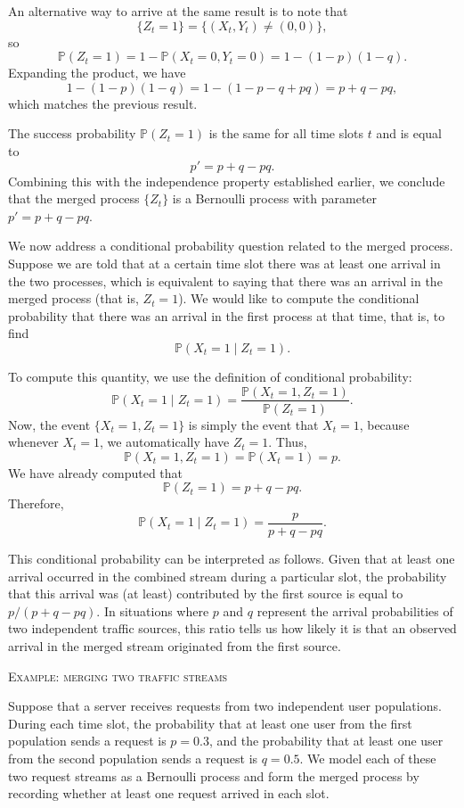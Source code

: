 An alternative way to arrive at the same result is to note that
\[
\{Z_t = 1\}
=
\{(X_t, Y_t) \neq (0,0)\},
\]
so
\[
\mathbb{P}(Z_t = 1)
=
1 - \mathbb{P}(X_t = 0, Y_t = 0)
=
1 - (1-p)(1-q).
\]
Expanding the product, we have
\[
1 - (1-p)(1-q)
=
1 - (1 - p - q + pq)
=
p + q - pq,
\]
which matches the previous result.  

The success probability \(\mathbb{P}(Z_t = 1)\) is the same for all time slots \(t\) and is equal to
\[
p' = p + q - pq.
\]
Combining this with the independence property established earlier, we conclude that the merged process \(\{Z_t\}\) is a Bernoulli process with parameter \(p' = p + q - pq\).  

We now address a conditional probability question related to the merged process.  
Suppose we are told that at a certain time slot there was at least one arrival in the two processes, which is equivalent to saying that there was an arrival in the merged process (that is, \(Z_t = 1\)).  
We would like to compute the conditional probability that there was an arrival in the first process at that time, that is, to find
\[
\mathbb{P}(X_t = 1 \mid Z_t = 1).
\]

To compute this quantity, we use the definition of conditional probability:
\[
\mathbb{P}(X_t = 1 \mid Z_t = 1)
=
\frac{\mathbb{P}(X_t = 1, Z_t = 1)}{\mathbb{P}(Z_t = 1)}.
\]
Now, the event \(\{X_t = 1, Z_t = 1\}\) is simply the event that \(X_t = 1\), because whenever \(X_t = 1\), we automatically have \(Z_t = 1\).  
Thus,
\[
\mathbb{P}(X_t = 1, Z_t = 1) = \mathbb{P}(X_t = 1) = p.
\]
We have already computed that
\[
\mathbb{P}(Z_t = 1) = p + q - pq.
\]
Therefore,
\[
\mathbb{P}(X_t = 1 \mid Z_t = 1)
=
\frac{p}{p + q - pq}.
\]

This conditional probability can be interpreted as follows.  
Given that at least one arrival occurred in the combined stream during a particular slot, the probability that this arrival was (at least) contributed by the first source is equal to \(p / (p + q - pq)\).  
In situations where \(p\) and \(q\) represent the arrival probabilities of two independent traffic sources, this ratio tells us how likely it is that an observed arrival in the merged stream originated from the first source.  

\bigskip
\textsc{Example: merging two traffic streams}

Suppose that a server receives requests from two independent user populations.  
During each time slot, the probability that at least one user from the first population sends a request is \(p = 0.3\), and the probability that at least one user from the second population sends a request is \(q = 0.5\).  
We model each of these two request streams as a Bernoulli process and form the merged process by recording whether at least one request arrived in each slot.  

